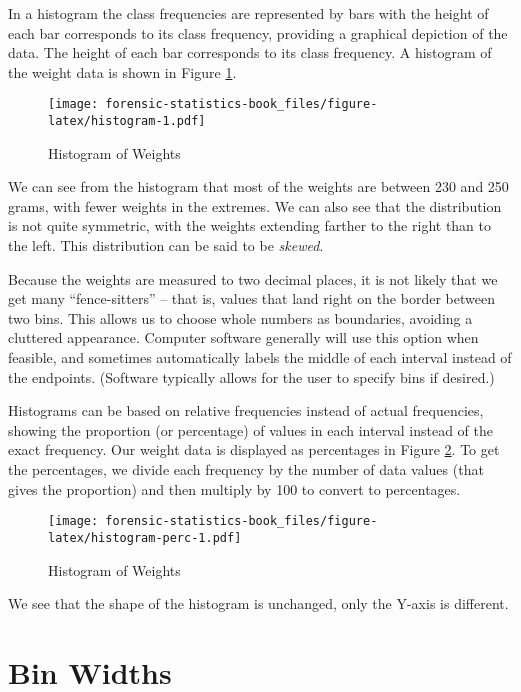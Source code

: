 \documentclass[
]{book}
\begin{document}
In a histogram the class frequencies are represented by bars with
the height of each bar corresponds to its class frequency,
providing a graphical
depiction of the data. The height of each bar corresponds
to its class frequency. A histogram of the weight data is shown in
Figure \ref{fig:histogram}.

\begin{figure}
\centering
\texttt{[image: forensic-statistics-book\_files/figure-latex/histogram-1.pdf]}
\caption{\label{fig:histogram}Histogram of Weights}
\end{figure}

We can see from the histogram that most of the weights are between 230 and 250 grams,
with fewer weights in the extremes. We can also see that the distribution is not
quite symmetric, with the weights extending farther to the right than to the left. This
distribution can be said to be \emph{skewed}.

Because the weights are measured to two decimal
places, it is not likely that we get many ``fence-sitters'' -- that is, values
that land right on the border between two bins. This allows us to choose
whole numbers as boundaries, avoiding a cluttered appearance. Computer
software generally will use this option when feasible, and sometimes automatically
labels the middle of each interval instead of the endpoints.
(Software typically allows for the user to specify bins if desired.)

Histograms can be based on relative frequencies instead of actual frequencies,
showing the proportion (or percentage) of values in each interval instead of
the exact frequency. Our weight data is displayed as percentages in
Figure \ref{fig:histogram-perc}. To get the percentages, we divide
each frequency by the number of data values (that gives the proportion) and
then multiply by 100 to convert to percentages.

\begin{figure}
\centering
\texttt{[image: forensic-statistics-book\_files/figure-latex/histogram-perc-1.pdf]}
\caption{\label{fig:histogram-perc}Histogram of Weights}
\end{figure}

We see that the shape of the histogram is unchanged, only the Y-axis is
different.

\hypertarget{bin-widths}{%
\section{Bin Widths}\label{bin-widths}}
\end{document}
